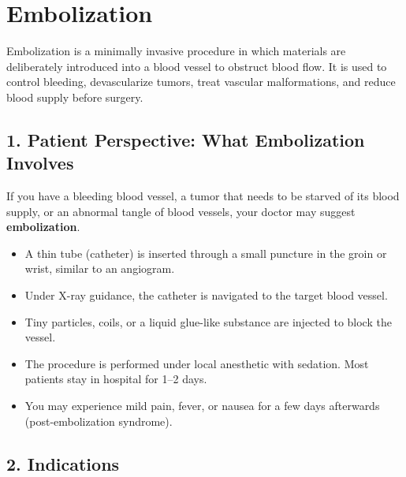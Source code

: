 \chapter{Embolization}

\label{ch:ch80_embolization}

Embolization is a minimally invasive procedure in which materials are deliberately introduced into a blood vessel to obstruct blood flow. It is used to control bleeding, devascularize tumors, treat vascular malformations, and reduce blood supply before surgery.


\section{1. Patient Perspective: What Embolization Involves}

If you have a bleeding blood vessel, a tumor that needs to be starved of its blood supply, or an abnormal tangle of blood vessels, your doctor may suggest \textbf{embolization}.

\begin{itemize}
  \item A thin tube (catheter) is inserted through a small puncture in the groin or wrist, similar to an angiogram.
  \item Under X-ray guidance, the catheter is navigated to the target blood vessel.
  \item Tiny particles, coils, or a liquid glue-like substance are injected to block the vessel.
  \item The procedure is performed under local anesthetic with sedation. Most patients stay in hospital for 1--2 days.
  \item You may experience mild pain, fever, or nausea for a few days afterwards (post-embolization syndrome).
\end{itemize}


\section{2. Indications}

